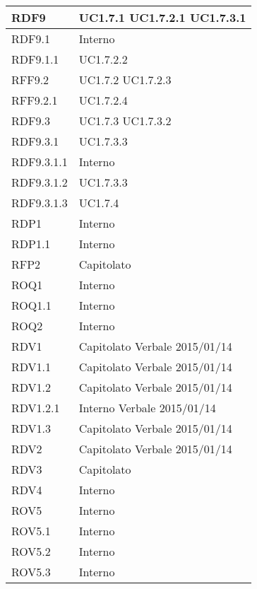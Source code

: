 \begin{center}
\begin{longtable}{| p{4cm} | p{4cm} |}
	\hline
	RDF9  &  UC1.7.1 \newline UC1.7.2.1 \newline UC1.7.3.1 \\
	\hline
	RDF9.1  &  Interno \\
	\hline
	RDF9.1.1  &  UC1.7.2.2 \\
	\hline
	RFF9.2  &  UC1.7.2 \newline UC1.7.2.3  \\
	\hline
	RFF9.2.1  &  UC1.7.2.4 \\
	\hline
	RDF9.3  & UC1.7.3  \newline UC1.7.3.2 \\
	\hline
	RDF9.3.1  &  UC1.7.3.3\\
	\hline
	RDF9.3.1.1  &  Interno \\
	\hline
	RDF9.3.1.2  &  UC1.7.3.3\\
	\hline
	RDF9.3.1.3  &  UC1.7.4\\
	\hline



	RDP1  &  Interno \\
	\hline
	RDP1.1  &  Interno \\
	\hline
	RFP2  &  Capitolato \\
	\hline



	ROQ1  &  Interno \\
	\hline
	ROQ1.1  &  Interno \\
	\hline
	ROQ2  &  Interno \\
	\hline




	RDV1 &  Capitolato \newline Verbale 2015/01/14 \\
	\hline
	RDV1.1  &  Capitolato \newline Verbale 2015/01/14 \\
	\hline
	RDV1.2  &  Capitolato \newline Verbale 2015/01/14 \\
	\hline
	RDV1.2.1  &  Interno \newline Verbale 2015/01/14 \\
	\hline
	RDV1.3  &  Capitolato \newline Verbale 2015/01/14 \\
	\hline
	RDV2  &  Capitolato \newline Verbale 2015/01/14 \\
	\hline
	RDV3  &  Capitolato \\
	\hline
	RDV4  &  Interno \\
	\hline
	ROV5  &  Interno \\
	\hline
	ROV5.1  &  Interno \\
	\hline
	ROV5.2  &  Interno \\
	\hline
	ROV5.3  &  Interno \\
	\hline


\end{longtable}
\egroup
\end{center}

